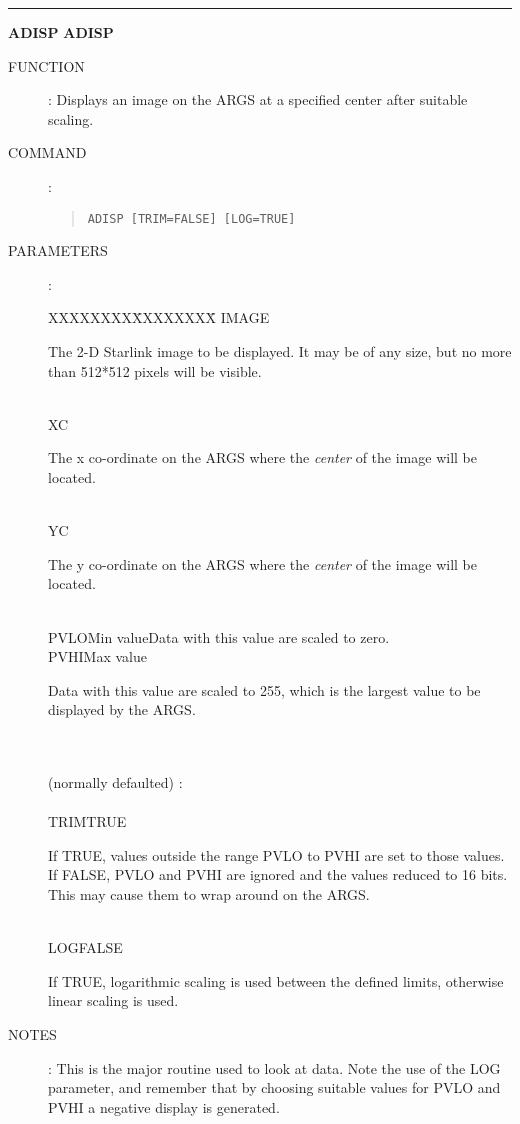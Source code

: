 \goodbreak
\rule{\textwidth}{0.3mm}
{\Large {\bf ADISP} \hfill {\bf ADISP}}
\begin{description}
\item [FUNCTION]:
Displays an image on the ARGS at a specified center after suitable scaling.
\item [COMMAND]:
\begin{quote}
{\tt ADISP [TRIM=FALSE] [LOG=TRUE]}
\end{quote}
\item [PARAMETERS]:
\begin{tabbing}
XXXXXXXX\=XXXXXXXX\=\kill
IMAGE\>\>\begin{minipage}[t]{100mm}
The 2-D Starlink image to be displayed. It may be of any size, but no more than
512*512 pixels will be visible.
\end{minipage}\\
XC\>\begin{minipage}[t]{100mm}
The x co-ordinate on the ARGS where the {\em center} of the image will be
located.
\end{minipage}\\
YC\>\begin{minipage}[t]{100mm}
The y co-ordinate on the ARGS where the {\em center} of the image will be
located.
\end{minipage}\\
PVLO\>Min value\>Data with this value are scaled to zero.\\
PVHI\>Max value\>\begin{minipage}[t]{100mm}
Data with this value are scaled to 255, which is the largest value to be
displayed by the ARGS.
\end{minipage}\\
\\
(normally defaulted) :\\
\\
TRIM\>TRUE\>\begin{minipage}[t]{100mm}
If TRUE, values outside the range PVLO to PVHI are set to those values.
If FALSE, PVLO and PVHI are ignored and the values reduced to 16 bits.
This may cause them to wrap around on the ARGS.
\end{minipage}\\
LOG\>FALSE\>\begin{minipage}[t]{100mm}
If TRUE, logarithmic scaling is used between the defined limits, otherwise
linear scaling is used.
\end{minipage}
\end{tabbing}
\item [NOTES]:
This is the major routine used to look at data.
Note the use of the LOG parameter, and remember that by choosing suitable values
for PVLO and PVHI a negative display is generated.
\end{description}

